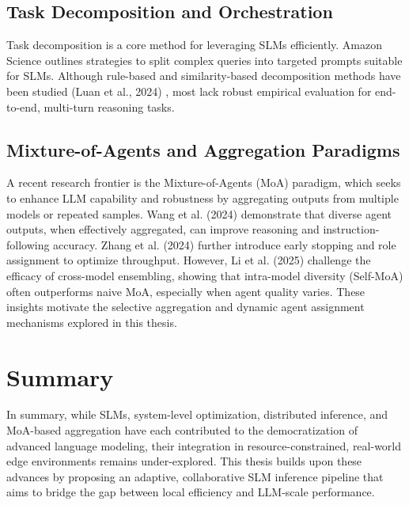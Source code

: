 \subsection{Task Decomposition and Orchestration}
Task decomposition is a core method for leveraging SLMs efficiently. Amazon Science outlines strategies to split complex queries into targeted prompts suitable for SLMs. Although rule-based and similarity-based decomposition methods have been studied (Luan et al., 2024) \cite{Luan2024Hierarchical}, most lack robust empirical evaluation for end-to-end, multi-turn reasoning tasks.

\subsection{Mixture-of-Agents and Aggregation Paradigms}
A recent research frontier is the Mixture-of-Agents (MoA) paradigm, which seeks to enhance LLM capability and robustness by aggregating outputs from multiple models or repeated samples. Wang et al. (2024) \cite{Wang2024MoA} demonstrate that diverse agent outputs, when effectively aggregated, can improve reasoning and instruction-following accuracy. Zhang et al. (2024) \cite{Zhang2024SMoA} further introduce early stopping and role assignment to optimize throughput. However, Li et al. (2025) \cite{Li2025RethinkingMoA} challenge the efficacy of cross-model ensembling, showing that intra-model diversity (Self-MoA) often outperforms naive MoA, especially when agent quality varies. These insights motivate the selective aggregation and dynamic agent assignment mechanisms explored in this thesis.

\section{Summary}
In summary, while SLMs, system-level optimization, distributed inference, and MoA-based aggregation have each contributed to the democratization of advanced language modeling, their integration in resource-constrained, real-world edge environments remains under-explored. This thesis builds upon these advances by proposing an adaptive, collaborative SLM inference pipeline that aims to bridge the gap between local efficiency and LLM-scale performance. 